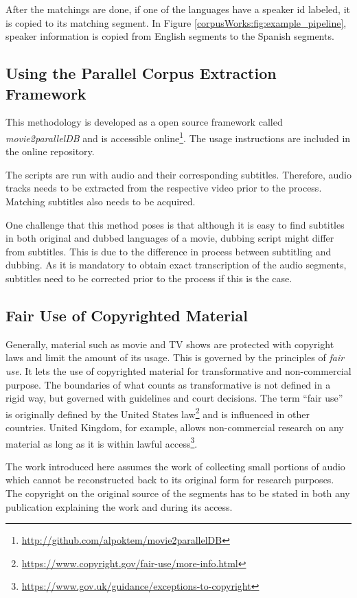 After the matchings are done, if one of the languages have a speaker id labeled, it is copied to its matching segment. In Figure \ref{corpusWorks:fig:example_pipeline}, speaker information is copied from English segments to the Spanish segments. 

\subsection{Using the Parallel Corpus Extraction Framework}
This methodology is developed as a open source framework called \textit{movie2parallelDB} and is accessible online\footnote{\url{http://github.com/alpoktem/movie2parallelDB}}. The usage instructions are included in the online repository. 

The scripts are run with audio and their corresponding subtitles. Therefore, audio tracks needs to be extracted from the respective video prior to the process. Matching subtitles also needs to be acquired. 

One challenge that this method poses is that although it is easy to find subtitles in both original and dubbed languages of a movie, dubbing script might differ from subtitles. This is due to the difference in process between subtitling and dubbing. As it is mandatory to obtain exact transcription of the audio segments, subtitles need to be corrected prior to the process if this is the case. 

\subsection{Fair Use of Copyrighted Material}
\label{corpusWorks:fairuse}

Generally, material such as movie and TV shows are protected with copyright laws and limit the amount of its usage. This is governed by the principles of \textit{fair use}. It lets the use of copyrighted material for transformative and non-commercial purpose. The boundaries of what counts as transformative is not defined in a rigid way, but governed with guidelines and court decisions. The term ``fair use'' is originally defined by the United States law\footnote{\url{https://www.copyright.gov/fair-use/more-info.html}} and is influenced in other countries. United Kingdom, for example, allows non-commercial research on any material as long as it is within lawful access\footnote{\url{https://www.gov.uk/guidance/exceptions-to-copyright}}. 

The work introduced here assumes the work of collecting small portions of audio which cannot be reconstructed back to its original form for research purposes. The copyright on the original source of the segments has to be stated in both any publication explaining the work and during its access.

